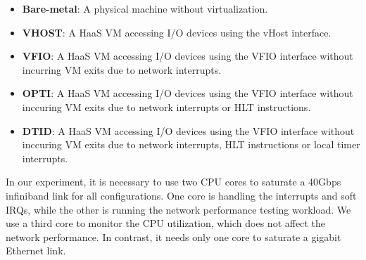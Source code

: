 \begin{itemize}
\setlength\itemsep{-0.04in}
  \item {\bf Bare-metal}: A physical machine without virtualization.
  
  \item {\bf VHOST}: A HaaS VM accessing I/O devices using the vHost interface.
  
  \item {\bf VFIO}: A HaaS VM accessing I/O devices using the VFIO interface without incurring VM exits due to network interrupts.
  
  \item {\bf OPTI}: A HaaS VM accessing I/O devices using the VFIO interface without inccuring VM exits due to network interrupts or HLT instructions.  
  
  \item{\bf  DTID}: A HaaS VM accessing I/O devices using the VFIO interface without inccuring VM exits due to network interrupts, HLT instructions or local timer interrupts.  
 
\end{itemize}




In our experiment, it is necessary to use two CPU cores to
saturate a 40Gbps infiniband link for all configurations. One
core is handling the interrupts and soft IRQs, while the other
is running the network performance testing workload. We use a third
core to monitor the CPU utilization, which does not
affect the network performance. In contrast, it needs only one
core to saturate a gigabit Ethernet link.
